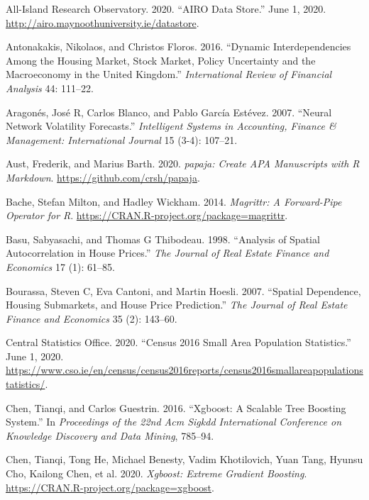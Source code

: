 \documentclass[conference,final,]{IEEEtran}
\newlength{\cslhangindent}
\newenvironment{cslreferences}%
  {\setlength{\parindent}{0pt}%
  \everypar{\setlength{\hangindent}{\cslhangindent}}\ignorespaces}%
  {\par}
\begin{document}
\hypertarget{refs}{}
\begin{cslreferences}
\leavevmode\hypertarget{ref-airo2020}{}%
All-Island Research Observatory. 2020. ``AIRO Data Store.'' June 1, 2020. \url{http://airo.maynoothuniversity.ie/datastore}.

\leavevmode\hypertarget{ref-antonakakis2016dynamic}{}%
Antonakakis, Nikolaos, and Christos Floros. 2016. ``Dynamic Interdependencies Among the Housing Market, Stock Market, Policy Uncertainty and the Macroeconomy in the United Kingdom.'' \emph{International Review of Financial Analysis} 44: 111--22.

\leavevmode\hypertarget{ref-aragones2007neural}{}%
Aragonés, José R, Carlos Blanco, and Pablo García Estévez. 2007. ``Neural Network Volatility Forecasts.'' \emph{Intelligent Systems in Accounting, Finance \& Management: International Journal} 15 (3-4): 107--21.

\leavevmode\hypertarget{ref-R-papaja}{}%
Aust, Frederik, and Marius Barth. 2020. \emph{papaja: Create APA Manuscripts with R Markdown}. \url{https://github.com/crsh/papaja}.

\leavevmode\hypertarget{ref-R-magrittr}{}%
Bache, Stefan Milton, and Hadley Wickham. 2014. \emph{Magrittr: A Forward-Pipe Operator for R}. \url{https://CRAN.R-project.org/package=magrittr}.

\leavevmode\hypertarget{ref-basu1998analysis}{}%
Basu, Sabyasachi, and Thomas G Thibodeau. 1998. ``Analysis of Spatial Autocorrelation in House Prices.'' \emph{The Journal of Real Estate Finance and Economics} 17 (1): 61--85.

\leavevmode\hypertarget{ref-bourassa2007spatial}{}%
Bourassa, Steven C, Eva Cantoni, and Martin Hoesli. 2007. ``Spatial Dependence, Housing Submarkets, and House Price Prediction.'' \emph{The Journal of Real Estate Finance and Economics} 35 (2): 143--60.

\leavevmode\hypertarget{ref-cso2020}{}%
Central Statistics Office. 2020. ``Census 2016 Small Area Population Statistics.'' June 1, 2020. \url{https://www.cso.ie/en/census/census2016reports/census2016smallareapopulationstatistics/}.

\leavevmode\hypertarget{ref-chen2016xgboost}{}%
Chen, Tianqi, and Carlos Guestrin. 2016. ``Xgboost: A Scalable Tree Boosting System.'' In \emph{Proceedings of the 22nd Acm Sigkdd International Conference on Knowledge Discovery and Data Mining}, 785--94.

\leavevmode\hypertarget{ref-R-xgboost}{}%
Chen, Tianqi, Tong He, Michael Benesty, Vadim Khotilovich, Yuan Tang, Hyunsu Cho, Kailong Chen, et al. 2020. \emph{Xgboost: Extreme Gradient Boosting}. \url{https://CRAN.R-project.org/package=xgboost}.


\end{cslreferences}
\end{document}
